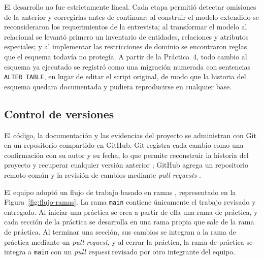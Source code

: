 El desarrollo no fue estrictamente lineal. Cada etapa permitió detectar omisiones de la anterior y corregirlas antes de continuar: al construir el modelo extendido se reconsideraron los requerimientos de la entrevista; al transformar el modelo al relacional se levantó primero un inventario de entidades, relaciones y atributos especiales; y al implementar las restricciones de dominio se encontraron reglas que el esquema todavía no protegía. A partir de la Práctica~4, todo cambio al esquema ya ejecutado se registró como una migración numerada con sentencias \texttt{ALTER TABLE}, en lugar de editar el script original, de modo que la historia del esquema quedara documentada y pudiera reproducirse en cualquier base.

\subsection{Control de versiones}

El código, la documentación y las evidencias del proyecto se administran con Git en un repositorio compartido en GitHub. Git registra cada cambio como una confirmación con su autor y su fecha, lo que permite reconstruir la historia del proyecto y recuperar cualquier versión anterior \parencite{chacon_progit}; GitHub agrega un repositorio remoto común y la revisión de cambios mediante \textit{pull requests} \parencite{github_repositories}.

El equipo adoptó un flujo de trabajo basado en ramas \parencite{atlassian_feature_branch}, representado en la Figura~\ref{fig:flujo-ramas}. La rama \texttt{main} contiene únicamente el trabajo revisado y entregado. Al iniciar una práctica se crea a partir de ella una rama de práctica, y cada sección de la práctica se desarrolla en una rama propia que sale de la rama de práctica. Al terminar una sección, sus cambios se integran a la rama de práctica mediante un \textit{pull request}, y al cerrar la práctica, la rama de práctica se integra a \texttt{main} con un \textit{pull request} revisado por otro integrante del equipo.

